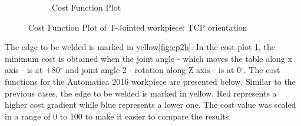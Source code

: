 \begin{figure}[!htbp]
\begin{subfigure}[b]{0.4\textwidth}
		\caption{Cost Function Plot}  
		\label{fig:cp2a}
	\end{subfigure}	
	\caption{Cost Function Plot of T-Jointed workpiece: TCP orientation}
	\label{fig:cp2}
\end{figure}
The edge to be welded is marked in yellow\ref{fig:cp2b}. In the cost plot \ref{fig:cp2a}, the minimum cost is obtained when the joint angle - which moves the table along x axis - is at +80$^{\circ}$ and joint angle 2 - rotation along Z axis - is at 0$^{\circ}$.
\clearpage
The cost functions for the Automatica 2016 workpiece are presented below. Similar to the previous cases, the edge to be welded is marked in yellow. Red represents a higher cost gradient while blue represents a lower one. The cost value was scaled in a range of 0 to 100 to make it easier to compare the results.

